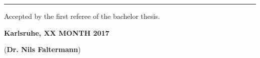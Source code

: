 \vspace*{\fill}

\rule{1.0\textwidth}{0.6pt}

\vspace*{0.75em}

Accepted by the first referee of the bachelor thesis.

\textbf{Karlsruhe, XX MONTH 2017}

\vspace*{4em}

\dotfill \hspace*{8cm} 

\hspace*{0.82cm}(\textbf{Dr. Nils Faltermann})
